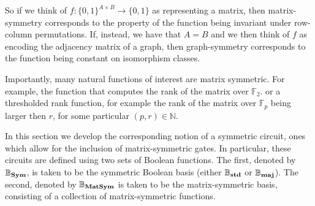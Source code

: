 \documentclass[../paper.tex]{subfiles}
\begin{document}
So if we think of $f: \{0,1\}^{A \times B} \rightarrow \{0,1\}$ as representing
a matrix, then matrix-symmetry corresponds to the property of the function being
invariant under row-column permutations. If, instead, we have that $A = B$ and
we then think of $f$ as encoding the adjacency matrix of a graph, then
graph-symmetry corresponds to the function being constant on isomorphism
classes.

Importantly, many natural functions of interest are matrix symmetric. For
example, the function that computes the rank of the matrix over $\mathbb{F}_2$.
or a thresholded rank function, for example the rank of the matrix over
$\mathbb{F}_p$ being larger then $r$, for some particular $(p, r) \in
\mathbb{N}$.


In this section we develop the corresponding notion of a symmetric circuit, ones
which allow for the inclusion of matrix-symmetric gates. In particular, these
circuits are defined using two sets of Boolean functions. The first, denoted by
$\mathbb{B}_{\text{\textbf{Sym}}}$, is taken to be the symmetric Boolean basis (either
$\mathbb{B}_{\text{\textbf{std}}}$ or $\mathbb{B}_{\text{\textbf{maj}}}$). The second, denoted by
$\mathbb{B}_{\text{\textbf{MatSym}}}$ is taken to be the matrix-symmetric basis, consisting of a
collection of matrix-symmetric functions.
\end{document}
